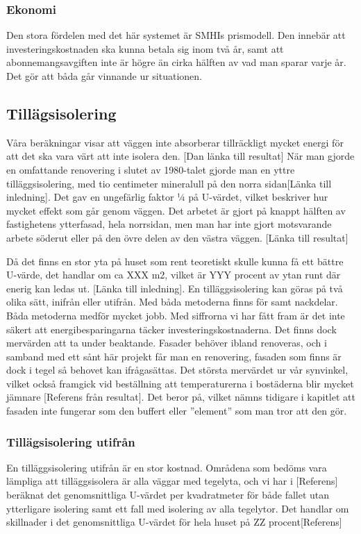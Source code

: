 \subsubsection{Ekonomi}
Den stora fördelen med det här systemet är SMHIs prismodell. Den innebär att investeringskostnaden ska kunna betala sig inom två år, samt att abonnemangsavgiften inte är högre än cirka hälften av vad man sparar varje år. Det gör att båda går vinnande ur situationen.
\subsection{Tillägsisolering}
Våra beräkningar visar att väggen inte absorberar tillräckligt mycket energi för att det ska vara värt att inte isolera den.  [Dan länka till resultat]
När man gjorde en omfattande renovering i slutet av 1980-talet gjorde man en yttre tilläggsisolering, med tio centimeter mineralull på den norra sidan[Länka till inledning]. Det gav en ungefärlig faktor ¼ på U-värdet, vilket beskriver hur mycket effekt som går genom väggen. Det arbetet är gjort på knappt hälften av fastighetens ytterfasad, hela norrsidan, men man har inte gjort motsvarande arbete söderut eller på den övre delen av den västra väggen. [Länka till resultat]

Då det finns en stor yta på huset som rent teoretiskt skulle kunna få ett bättre U-värde, det handlar om ca XXX m2, vilket är YYY procent av ytan runt där enerig kan ledas ut. [Länka till inledning].
En tilläggsisolering kan göras på två olika sätt, inifrån eller utifrån. Med båda metoderna finns för samt nackdelar. Båda metoderna medför mycket jobb. Med siffrorna vi har fått fram är det inte säkert att energibesparingarna täcker investeringskostnaderna. Det finns dock mervärden att ta under beaktande. Fasader behöver ibland renoveras, och i samband med ett sånt här projekt får man en renovering, fasaden som finns är dock i tegel så behovet kan ifrågasättas. Det största mervärdet ur vår synvinkel, vilket också framgick vid beställning att temperaturerna i bostäderna blir mycket jämnare [Referens från resultat]. Det beror på, vilket nämns tidigare i kapitlet att fasaden inte fungerar som den buffert eller ”element” som man tror att den gör.
\subsubsection{Tillägsisolering utifrån}
En tilläggsisolering utifrån är en stor kostnad. Områdena som bedöms vara lämpliga att tilläggsisolera är alla väggar med tegelyta, och vi har i [Referens] beräknat det genomsnittliga U-värdet per kvadratmeter för både fallet utan ytterligare isolering samt ett fall med isolering av alla tegelytor. Det handlar om skillnader i det genomsnittliga U-värdet för hela huset på ZZ procent[Referens]
